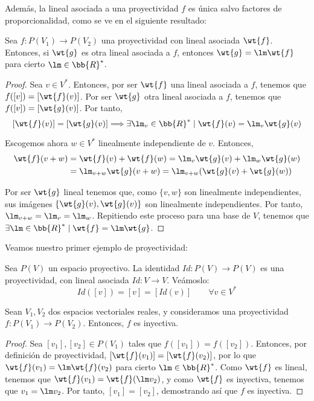 Además, la lineal asociada a una proyectividad $f$ es única salvo factores de proporcionalidad, como se ve en el siguiente resultado:
\begin{prop}
    Sea $f:P(V_1)\to P(V_2)$ una proyectividad con lineal asociada $\wt{f}$.
    Entonces, si $\wt{g}$ es otra lineal asociada a $f$, entonces $\wt{g}=\lm \wt{f}$ para cierto $\lm \in \bb{R}^\ast$.
\end{prop}
\begin{proof}
    Sea $v\in V^\ast$. Entonces, por ser $\wt{f}$ una lineal asociada a $f$, tenemos que $f([v])=\left[\wt{f}(v)\right]$.
    Por ser $\wt{g}$ otra lineal asociada a $f$, tenemos que $f([v])=[\wt{g}(v)]$. Por tanto,
    \begin{equation*}
        \left[\wt{f}(v)\right]=[\wt{g}(v)] \Longrightarrow \exists \lm_v \in \bb{R}^\ast \mid \wt{f}(v)=\lm_v \wt{g}(v)
    \end{equation*}

    Escogemos ahora $w\in V^\ast$ linealmente independiente de $v$. Entonces,
    \begin{equation*}
        \begin{split}
            \wt{f}(v+w) &= \wt{f}(v) + \wt{f}(w) = \lm_v \wt{g}(v) + \lm _w \wt{g}(w)\\
            &= \lm_{v+w} \wt{g}(v+w) = \lm_{v+w} (\wt{g}(v) + \wt{g}(w))
        \end{split}
    \end{equation*}

    Por ser $\wt{g}$ lineal tenemos que, como $\{v,w\}$ son linealmente independientes, sus imágenes $\{\wt{g}(v), \wt{g}(v)\}$ son linealmente independientes. Por tanto, $\lm_{v+w} = \lm_v = \lm_w$.
    Repitiendo este proceso para una base de $V$, tenemos que $\exists \lm \in \bb{R}^\ast \mid \wt{f}=\lm \wt{g}$.
\end{proof}

Veamos nuestro primer ejemplo de proyectividad:
\begin{ejemplo}
    Sea $P(V)$ un espacio proyectivo. La identidad $Id:P(V)\to P(V)$ es una proyectividad, con lineal asociada $Id:V\to V$.
    Veámoslo:
    \begin{equation*}
        Id([v]) = [v] = \left[Id(v)\right] \qquad \forall v\in V^\ast
    \end{equation*}
\end{ejemplo}


\begin{prop}
    Sean $V_1,V_2$ dos espacios vectoriales reales, y consideramos una proyectividad $f:P(V_1)\to P(V_2)$. Entonces, $f$ es inyectiva.
\end{prop}
\begin{proof}
    Sea $[v_1],[v_2]\in P(V_1)$ tales que $f([v_1])=f([v_2])$. Entonces, por definición de proyectividad, $\left[\wt{f}(v_1)\right]=\left[\wt{f}(v_2)\right]$, por lo que $\wt{f}(v_1)=\lm \wt{f}(v_2)$ para cierto $\lm \in \bb{R}^\ast$.
    Como $\wt{f}$ es lineal, tenemos que $\wt{f}(v_1) = \wt{f}(\lm v_2)$, y como $\wt{f}$ es inyectiva, tenemos que $v_1 = \lm v_2$. Por tanto, $[v_1]=[v_2]$, demostrando así que $f$ es inyectiva.
\end{proof}




